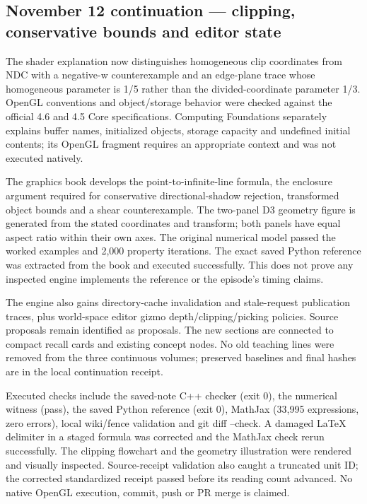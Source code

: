 \subsection{November 12 continuation --- clipping, conservative bounds and editor state}\label{appendix-a103e7846d21-november-12-continuation-clipping-conservative-bounds-and-editor-state}

The shader explanation now distinguishes homogeneous clip coordinates from NDC with a negative-w counterexample and an edge-plane trace whose homogeneous parameter is 1/5 rather than the divided-coordinate parameter 1/3. OpenGL conventions and object/storage behavior were checked against the official 4.6 and 4.5 Core specifications. Computing Foundations separately explains buffer names, initialized objects, storage capacity and undefined initial contents; its OpenGL fragment requires an appropriate context and was not executed natively.

The graphics book develops the point-to-infinite-line formula, the enclosure argument required for conservative directional-shadow rejection, transformed object bounds and a shear counterexample. The two-panel D3 geometry figure is generated from the stated coordinates and transform; both panels have equal aspect ratio within their own axes. The original numerical model passed the worked examples and 2,000 property iterations. The exact saved Python reference was extracted from the book and executed successfully. This does not prove any inspected engine implements the reference or the episode's timing claims.

The engine also gains directory-cache invalidation and stale-request publication traces, plus world-space editor gizmo depth/clipping/picking policies. Source proposals remain identified as proposals. The new sections are connected to compact recall cards and existing concept nodes. No old teaching lines were removed from the three continuous volumes; preserved baselines and final hashes are in the local {continuation receipt}.

Executed checks include the saved-note C++ checker (exit 0), the numerical witness (pass), the saved Python reference (exit 0), MathJax (33,995 expressions, zero errors), local wiki/fence validation and git diff --check. A damaged LaTeX delimiter in a staged formula was corrected and the MathJax check rerun successfully. The clipping flowchart and the geometry illustration were rendered and visually inspected. Source-receipt validation also caught a truncated unit ID; the corrected standardized receipt passed before its reading count advanced. No native OpenGL execution, commit, push or PR merge is claimed.

